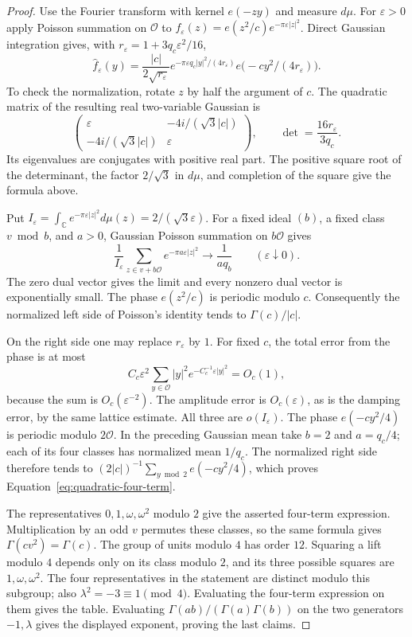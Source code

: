 \documentclass[11pt,a4paper]{article}
\numberwithin{equation}{section}
\numberwithin{figure}{section}
\theoremstyle{definition}
\theoremstyle{remark}
\begin{document}
\begin{proof}
Use the Fourier transform with kernel $e(-zy)$ and measure $d\mu$.
For $\varepsilon>0$ apply Poisson summation on $\mathcal O$ to
$f_\varepsilon(z)=e(z^2/c)e^{-\pi\varepsilon|z|^2}$.  Direct Gaussian
integration gives, with $r_\varepsilon=1+3q_c\varepsilon^2/16$,
\[
 \widehat f_\varepsilon(y)
 =\frac{|c|}{2\sqrt{r_\varepsilon}}
    e^{-\pi\varepsilon q_c|y|^2/(4r_\varepsilon)}
    e\bigl(-cy^2/(4r_\varepsilon)\bigr).
\]
To check the normalization, rotate $z$ by half the argument of $c$.  The
quadratic matrix of the resulting real two-variable Gaussian is
\[
 \begin{pmatrix}
 \varepsilon&-4i/(\sqrt3|c|)\\
 -4i/(\sqrt3|c|)&\varepsilon
 \end{pmatrix},
 \qquad \det=\frac{16r_\varepsilon}{3q_c}.
\]
Its eigenvalues are conjugates with positive real part.  The positive square
root of the determinant, the factor $2/\sqrt3$ in $d\mu$, and completion of
the square give the formula above.

Put $I_\varepsilon=\int_{\mathbb C}e^{-\pi\varepsilon|z|^2}d\mu(z)
=2/(\sqrt3\varepsilon)$.  For a fixed ideal $(b)$, a fixed class $v\bmod b$,
and $a>0$, Gaussian Poisson summation on $b\mathcal O$ gives
\[
 \frac1{I_\varepsilon}\sum_{z\in v+b\mathcal O}
             e^{-\pi a\varepsilon|z|^2}
 \longrightarrow\frac1{a q_b}\qquad(\varepsilon\downarrow0).
\]
The zero dual vector gives the limit and every nonzero dual vector is
exponentially small.  The phase $e(z^2/c)$ is periodic modulo $c$.
Consequently the normalized left side of Poisson's identity tends to
$\Gamma(c)/|c|$.

On the right side one may replace $r_\varepsilon$ by $1$.  For fixed $c$,
the total error from the phase is at most
\[
 C_c\varepsilon^2\sum_{y\in\mathcal O}|y|^2
                         e^{-C_c^{-1}\varepsilon|y|^2}=O_c(1),
\]
because the sum is $O_c(\varepsilon^{-2})$.  The amplitude error is
$O_c(\varepsilon)$, as is the damping error, by the same lattice estimate.
All three are $o(I_\varepsilon)$.  The phase $e(-cy^2/4)$ is periodic modulo
$2\mathcal O$.  In the preceding Gaussian mean take $b=2$ and $a=q_c/4$;
each of its four classes has normalized mean $1/q_c$.  The normalized right
side therefore tends to $(2|c|)^{-1}\sum_{y\bmod2}e(-cy^2/4)$, which proves
Equation~\eqref{eq:quadratic-four-term}.

The representatives $0,1,\omega,\omega^2$ modulo $2$ give the asserted
four-term expression.  Multiplication by an odd $v$ permutes these classes,
so the same formula gives $\Gamma(cv^2)=\Gamma(c)$.  The group of units
modulo $4$ has order $12$.  Squaring a lift modulo $4$ depends only on its
class modulo $2$, and its three possible squares are $1,\omega,\omega^2$.
The four representatives in the statement are distinct modulo this subgroup;
also $\lambda^2=-3\equiv1\pmod4$.  Evaluating the four-term expression on
them gives the table.  Evaluating $\Gamma(ab)/(\Gamma(a)\Gamma(b))$ on the
two generators $-1,\lambda$ gives the displayed exponent, proving the last
claims.
\end{proof}
\end{document}
